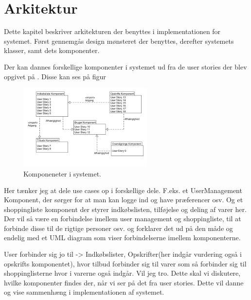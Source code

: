 \section{Arkitektur}
Dette kapitel beskriver arkitekturen der benyttes i implementationen for systemet.
Først gennemgås design mønsteret der benyttes, derefter systemets klasser, samt dets komponenter.







Der kan dannes forskellige komponenter i systemet ud fra de user stories der blev opgivet på . 
Disse kan ses på figur 

\begin{figure}
	\vspace{-20pt}
	\begin{center}
		\includegraphics[width=0.6\textwidth]{images/Diagrams/Komponenter.png}
	\end{center}
	\vspace{-20pt}
	\caption{Komponeneter i systemet.}
	\label{figure:komp}
	\vspace{-20pt}
\end{figure}

Her tænker jeg at dele use cases op i forskellige dele.
F.eks. et UserManagement Komponent, der sørger for at man kan logge ind og have præferencer osv.
Og et shoppingliste komponent der styrer indkøbslisten, tilføjelse og deling af varer her. Der vil så være en forbindelse imellem user management og shoppingliste, til at forbinde disse til de rigtige personer osv. og forklarer det ud på den måde og endelig med et UML diagram som viser forbindelserne imellem komponenterne.

User forbinder sig jo til -> Indkøbslister, Opskrifter(her indgår vurdering også i opskrifts komponentet), hvor tilbud forbinder sig til varer som så forbinder sig til shoppinglisterne hvor i varerne også indgår. Vil jeg tro. Dette skal vi diskutere, hvilke komponenter findes der, når vi ser på det fra user stories. Dette vil danne og vise sammenhæng i implementationen af systemet.